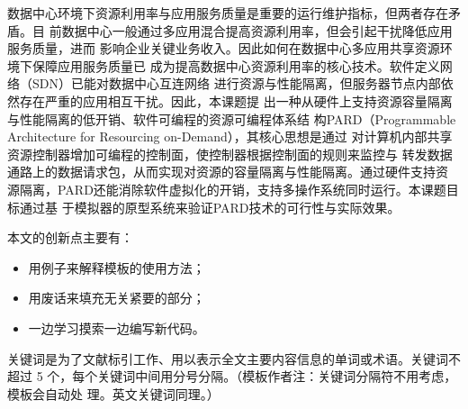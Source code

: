 

\makeatletter
\makeatother
{}




\begin{cabstract}
  数据中心环境下资源利用率与应用服务质量是重要的运行维护指标，但两者存在矛盾。目
  前数据中心一般通过多应用混合提高资源利用率，但会引起干扰降低应用服务质量，进而
  影响企业关键业务收入。因此如何在数据中心多应用共享资源环境下保障应用服务质量已
  成为提高数据中心资源利用率的核心技术。软件定义网络（SDN）已能对数据中心互连网络
  进行资源与性能隔离，但服务器节点内部依然存在严重的应用相互干扰。因此，本课题提
  出一种从硬件上支持资源容量隔离与性能隔离的低开销、软件可编程的资源可编程体系结
  构PARD（Programmable Architecture for Resourcing on-Demand），其核心思想是通过
  对计算机内部共享资源控制器增加可编程的控制面，使控制器根据控制面的规则来监控与
  转发数据通路上的数据请求包，从而实现对资源的容量隔离与性能隔离。通过硬件支持资
  源隔离，PARD还能消除软件虚拟化的开销，支持多操作系统同时运行。本课题目标通过基
  于模拟器的原型系统来验证PARD技术的可行性与实际效果。

  本文的创新点主要有：
  \begin{itemize}
    \item 用例子来解释模板的使用方法；
    \item 用废话来填充无关紧要的部分；
    \item 一边学习摸索一边编写新代码。
  \end{itemize}

  关键词是为了文献标引工作、用以表示全文主要内容信息的单词或术语。关键词不超过 5
  个，每个关键词中间用分号分隔。（模板作者注：关键词分隔符不用考虑，模板会自动处
  理。英文关键词同理。）
\end{cabstract}

